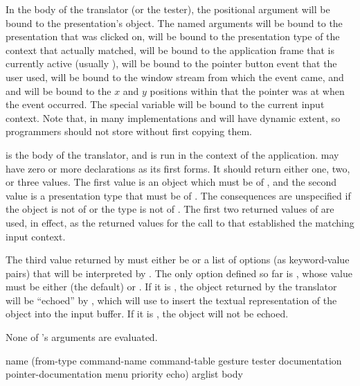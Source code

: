 In the body of the translator (or the tester), the positional 
argument will be bound to the presentation's object.  The named arguments
 will be bound to the presentation that was clicked on,
 will be bound to the presentation type of the context that
actually matched,  will be bound to the application frame that is
currently active (usually ),  will be bound
to the pointer button event that the user used,  will be bound to
the window stream from which the event came, and  and  will be
bound to the $x$ and $y$ positions within  that the pointer was at
when the event occurred.  The special variable  will be
bound to the current input context.  Note that, in many implementations
 and  will have dynamic extent, so
programmers should not store without first copying them.

 is the body of the translator, and is run in the context of the
application.   may have zero or more declarations as its first forms.
It should return either one, two, or three values.  The first value is an object
which must be  of , and the second value is
a presentation type that must be  of .
The consequences are unspecified if the object is not  of
 or the type is not  of .
The first two returned values of  are used, in effect, as the returned
values for the call to  that established the matching input context.

The third value returned by  must either be  or a list of
options (as keyword-value pairs) that will be interpreted by .  The
only option defined so far is , whose value must be either 
(the default) or .  If it is , the object returned by the
translator will be ``echoed'' by , which will use
 to insert the textual representation of the
object into the input buffer.  If it is , the object will not be
echoed.

None of 's arguments are evaluated.


 {name
                                                       (from-type command-name command-table
                                                        \key gesture tester
                                                             documentation pointer-documentation
                                                             menu priority echo)
                                                       arglist
                                                       \body body}

